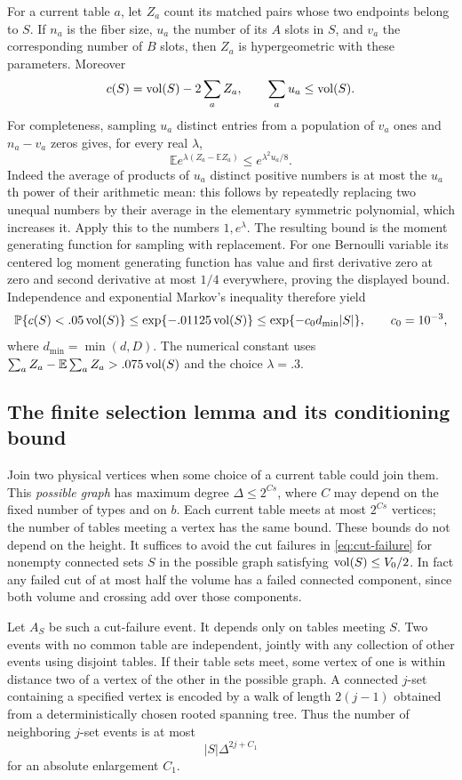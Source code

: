 For a current table $a$, let $Z_a$ count its matched pairs whose two
endpoints belong to $S$.  If $n_a$ is the fiber size, $u_a$ the
number of its $A$ slots in $S$, and $v_a$ the corresponding number
of $B$ slots, then $Z_a$ is hypergeometric with these parameters.
Moreover
\[
 c(S)=\operatorname{vol}(S)-2\sum_a Z_a,\qquad
 \sum_a u_a\leq\operatorname{vol}(S).
\]
For completeness, sampling $u_a$ distinct entries from a population
of $v_a$ ones and $n_a-v_a$ zeros gives, for every real $\lambda$,
\[
 \mathbb E e^{\lambda(Z_a-\mathbb EZ_a)}
       \leq e^{\lambda^2u_a/8}.
\]
Indeed the average of products of $u_a$ distinct positive numbers
is at most the $u_a$th power of their arithmetic mean: this follows
by repeatedly replacing two unequal numbers by their average in
the elementary symmetric polynomial, which increases it.  Apply
this to the numbers $1,e^\lambda$.  The resulting bound is the
moment generating function for sampling with replacement.  For
one Bernoulli variable its centered log moment generating function
has value and first derivative zero at zero and second derivative
at most $1/4$ everywhere, proving the displayed bound.
Independence and exponential Markov's inequality therefore yield
\begin{equation}\label{eq:cut-failure}
 \mathbb P\{c(S)<.05\operatorname{vol}(S)\}
 \leq \exp\{- .01125\operatorname{vol}(S)\}
 \leq \exp\{-c_0d_{\min}|S|\},\qquad c_0=10^{-3},
\end{equation}
where $d_{\min}=\min(d,D)$.  The numerical constant uses
$\sum_aZ_a-\mathbb E\sum_aZ_a>.075\operatorname{vol}(S)$ and the choice
$\lambda=.3$.

\subsection{The finite selection lemma and its conditioning bound}

Join two physical vertices when some choice of a current table
could join them.  This \emph{possible graph} has maximum degree
$\Delta\leq2^{C s}$, where $C$ may depend on the fixed number of
types and on $b$.  Each current table meets at most $2^{C s}$
vertices; the number of tables meeting a vertex has the same bound.
These bounds do not depend on the height.  It suffices to avoid
the cut failures in \eqref{eq:cut-failure} for nonempty connected
sets $S$ in the possible graph satisfying $\operatorname{vol}(S)\le V_0/2$.
In fact any failed cut of at most half the volume has a failed
connected component, since both volume and crossing add over
those components.

Let $A_S$ be such a cut-failure event.  It depends only on tables
meeting $S$.  Two events with no common table are independent,
jointly with any collection of other events using disjoint tables.
If their table sets meet, some vertex of one is within distance
two of a vertex of the other in the possible graph.  A connected
$j$-set containing a specified vertex is encoded by a walk of
length $2(j-1)$ obtained from a deterministically chosen rooted
spanning tree.  Thus the number of neighboring $j$-set events is
at most
\begin{equation}\label{eq:dependency-count}
 |S|\Delta^{2j+C_1}
\end{equation}
for an absolute enlargement $C_1$.

